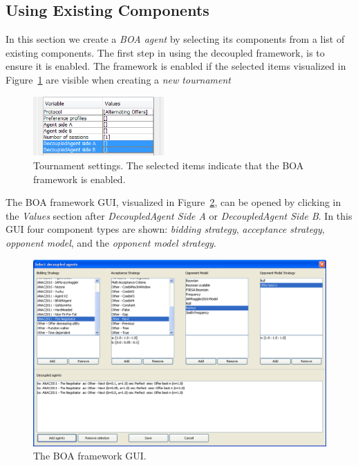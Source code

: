 \documentclass[]{article}
\begin{document}
\subsection{Using Existing Components}
In this section we create a \textit{BOA agent} by selecting its components from a list of existing components. The first step in using the decoupled framework, is to ensure it is enabled. The framework is enabled if the selected items visualized in Figure~\ref{fig:settings} are visible when creating a \textit{new tournament}%

\begin{figure}[h!]
	\center
	\includegraphics[width=5cm]{media/Decoupled_TournamentSettings.png}
	\caption{Tournament settings. The selected items indicate that the BOA framework is enabled.}
	\label{fig:settings}
\end{figure}

The BOA framework GUI, visualized in Figure~\ref{fig:decoupledGUI}, can be opened by clicking in the \textit{Values} section after \textit{DecoupledAgent Side A} or \textit{DecoupledAgent Side B}. In this GUI four component types are shown: \textit{bidding strategy}, \textit{acceptance strategy}, \textit{opponent model}, and the \textit{opponent model strategy}.

\begin{figure}[h!]
	\center
	\includegraphics[width=15cm]{media/Decoupled_DecoupledGUI.png}
	\caption{The BOA framework GUI.}
	\label{fig:decoupledGUI}
\end{figure}
\end{document}
